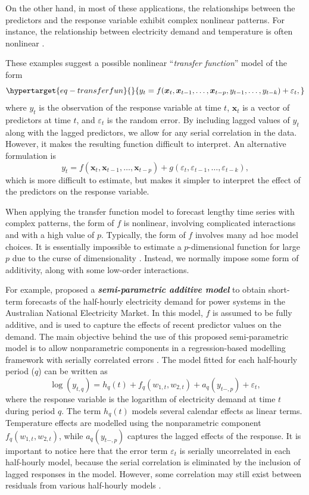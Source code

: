 \documentclass[11pt,a4paper,]{article}
\begin{document}
On the other hand, in most of these applications, the relationships
between the predictors and the response variable exhibit complex
nonlinear patterns. For instance, the relationship between electricity
demand and temperature is often nonlinear \autocite{HF2010,FH2012}.

These examples suggest a possible nonlinear ``\emph{transfer function}''
model of the form
\begin{equation}\protect\hypertarget{eq-transferfun}{}{
 y_t = f(\bm{x}_{t}, \bm{x}_{t-1}, \dots,\bm{x}_{t-p}, y_{t-1},\dots,y_{t-k}) + \varepsilon_{t},
}\label{eq-transferfun}\end{equation} where \(y_{t}\) is the observation
of the response variable at time \(t\), \(\bm{x}_{t}\) is a vector of
predictors at time \(t\), and \(\varepsilon_{t}\) is the random error.
By including lagged values of \(y_{t}\) along with the lagged
predictors, we allow for any serial correlation in the data. However, it
makes the resulting function difficult to interpret. An alternative
formulation is \[
 y_t = f(\bm{x}_{t}, \bm{x}_{t-1}, \dots,\bm{x}_{t-p}) + g(\varepsilon_{t}, \varepsilon_{t-1},\dots,\varepsilon_{t-k}),
\] which is more difficult to estimate, but makes it simpler to
interpret the effect of the predictors on the response variable.

When applying the transfer function model to forecast lengthy time
series with complex patterns, the form of \(f\) is nonlinear, involving
complicated interactions and with a high value of \(p\). Typically, the
form of \(f\) involves many ad hoc model choices. It is essentially
impossible to estimate a \(p\)-dimensional function for large \(p\) due
to the curse of dimensionality \autocite{Bellman57,Stone82}. Instead, we
normally impose some form of additivity, along with some low-order
interactions.

For example, \textcite{FH2012} proposed a \textbf{\emph{semi-parametric
additive model}} to obtain short-term forecasts of the half-hourly
electricity demand for power systems in the Australian National
Electricity Market. In this model, \(f\) is assumed to be fully
additive, and is used to capture the effects of recent predictor values
on the demand. The main objective behind the use of this proposed
semi-parametric model is to allow nonparametric components in a
regression-based modelling framework with serially correlated errors
\autocite{FH2012}. The model fitted for each half-hourly period (\(q\))
can be written as \[
 \log(y_{t,q}) = h_{q}(t) + f_{q}(w_{1,t},w_{2,t}) + a_{q}(y_{t-,p}) + \varepsilon_{t},
\] where the response variable is the logarithm of electricity demand at
time \(t\) during period \(q\). The term \(h_{q}(t)\) models several
calendar effects as linear terms. Temperature effects are modelled using
the nonparametric component \(f_{q}(w_{1,t},w_{2,t})\), while
\(a_{q}(y_{t-,p})\) captures the lagged effects of the response. It is
important to notice here that the error term \(\varepsilon_{t}\) is
serially uncorrelated in each half-hourly model, because the serial
correlation is eliminated by the inclusion of lagged responses in the
model. However, some correlation may still exist between residuals from
various half-hourly models \autocite{FH2012}.
\end{document}
